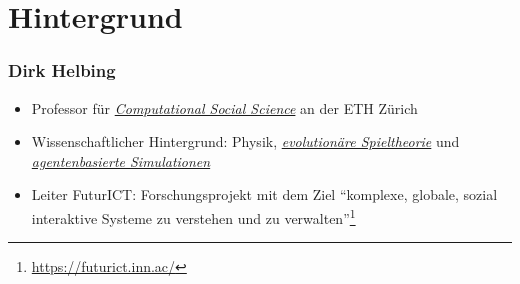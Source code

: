 \section{Hintergrund}
\begin{frame}
	\frametitle{Dirk Helbing}
	\begin{itemize}
		\item
			Professor für \hyperlink{computational_soc}{\textit{Computational Social Science}} an der ETH Zürich
		\item
			Wissenschaftlicher Hintergrund: Physik, \hyperlink{game_theory}{\textit{evolutionäre Spieltheorie}} und \hyperlink{agents}{\textit{agentenbasierte Simulationen}}
		\item
			Leiter FuturICT: Forschungsprojekt mit dem Ziel \enquote{komplexe, globale, sozial interaktive Systeme zu verstehen und zu verwalten}\footnote{\url{https://futurict.inn.ac/}}
	\end{itemize}

\end{frame}




